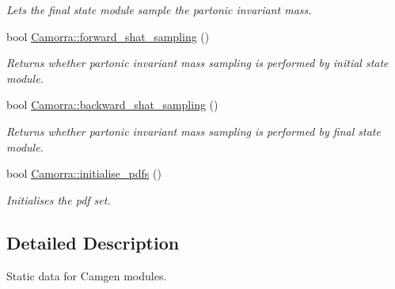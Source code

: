 \begin{DoxyCompactItemize}
\begin{DoxyCompactList}\small\item\em Lets the final state module sample the partonic invariant mass. \end{DoxyCompactList}\item 
bool \hyperlink{a00831_abce729e6c39e63ce207ee06da8be6498}{Camorra::forward\_\-shat\_\-sampling} ()
\begin{DoxyCompactList}\small\item\em Returns whether partonic invariant mass sampling is performed by initial state module. \end{DoxyCompactList}\item 
bool \hyperlink{a00831_afaf1ceb8d83f39ae2599190e77311ddd}{Camorra::backward\_\-shat\_\-sampling} ()
\begin{DoxyCompactList}\small\item\em Returns whether partonic invariant mass sampling is performed by final state module. \end{DoxyCompactList}\item 
bool \hyperlink{a00831_a10faaa355725620453fd5aa6cf7e2832}{Camorra::initialise\_\-pdfs} ()
\begin{DoxyCompactList}\small\item\em Initialises the pdf set. \end{DoxyCompactList}\end{DoxyCompactItemize}


\subsection{Detailed Description}
Static data for Camgen modules. 